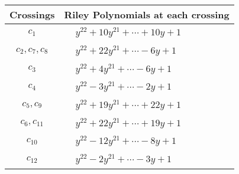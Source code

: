\documentclass[1p]{elsarticle_modified}
\theoremstyle{definition}
\begin{document}
\begin{tabular}{m{50pt}|m{274pt}}
Crossings & \hspace{64pt}Riley Polynomials at each crossing \\
\hline $$\begin{aligned}c_{1}\end{aligned}$$&$\begin{aligned}
&y^{22}+10 y^{21}+\cdots+10 y+1
\end{aligned}$\\
\hline $$\begin{aligned}c_{2},c_{7},c_{8}\end{aligned}$$&$\begin{aligned}
&y^{22}+22 y^{21}+\cdots-6 y+1
\end{aligned}$\\
\hline $$\begin{aligned}c_{3}\end{aligned}$$&$\begin{aligned}
&y^{22}+4 y^{21}+\cdots-6 y+1
\end{aligned}$\\
\hline $$\begin{aligned}c_{4}\end{aligned}$$&$\begin{aligned}
&y^{22}-3 y^{21}+\cdots-2 y+1
\end{aligned}$\\
\hline $$\begin{aligned}c_{5},c_{9}\end{aligned}$$&$\begin{aligned}
&y^{22}+19 y^{21}+\cdots+22 y+1
\end{aligned}$\\
\hline $$\begin{aligned}c_{6},c_{11}\end{aligned}$$&$\begin{aligned}
&y^{22}+22 y^{21}+\cdots+19 y+1
\end{aligned}$\\
\hline $$\begin{aligned}c_{10}\end{aligned}$$&$\begin{aligned}
&y^{22}-12 y^{21}+\cdots-8 y+1
\end{aligned}$\\
\hline $$\begin{aligned}c_{12}\end{aligned}$$&$\begin{aligned}
&y^{22}-2 y^{21}+\cdots-3 y+1
\end{aligned}$\\
\hline
\end{tabular}\\~\\
\end{document}
